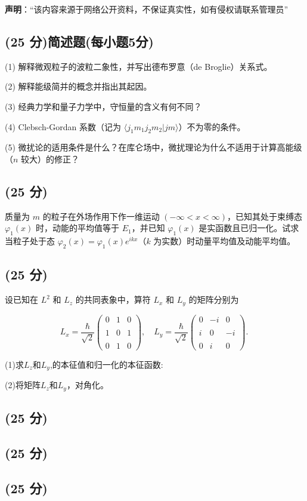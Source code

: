 
\textbf{声明}：“该内容来源于网络公开资料，不保证真实性，如有侵权请联系管理员”

\subsection{(25 分)简述题(每小题5分)}
(1) 解释微观粒子的波粒二象性，并写出德布罗意（de Broglie）关系式。

(2) 解释能级简并的概念并指出其起因。

(3) 经典力学和量子力学中，守恒量的含义有何不同？

(4) Clebsch-Gordan 系数（记为 $\langle  j_1 m_1 j_2 m_2|j m  \rangle$）不为零的条件。

(5) 微扰论的适用条件是什么？在库仑场中，微扰理论为什么不适用于计算高能级（$n$ 较大）的修正？

\subsection{(25 分)}
质量为 \( m \) 的粒子在外场作用下作一维运动 \((- \infty < x < \infty)\)，已知其处于束缚态 \(\varphi_1(x)\) 时，动能的平均值等于 \( E_1 \)，并已知 \(\varphi_1(x)\) 是实函数且已归一化。试求当粒子处于态 \(\varphi_2(x) = \varphi_1(x) e^{ikx}\)（\(k\) 为实数）时动量平均值及动能平均值。
\subsection{(25 分)}
设已知在 \( L^2 \) 和 \( L_z \) 的共同表象中，算符 \( L_x \) 和 \( L_y \) 的矩阵分别为

$$L_x = \frac{\hbar}{\sqrt{2}}\begin{pmatrix}0 & 1 & 0 \\\\1 & 0 & 1 \\\\0 & 1 & 0\end{pmatrix}, \quad L_y = \frac{\hbar}{\sqrt{2}}\begin{pmatrix}0 & -i & 0 \\\\i & 0 & -i \\\\0 & i & 0\end{pmatrix}.~$$

(1)求\( L_z \)和\( L_y \),的本征值和归一化的本征函数:

(2)将矩阵\( L_z \)和\( L_y \)，对角化。
\subsection{(25 分)}

\subsection{(25 分)}

\subsection{(25 分)}